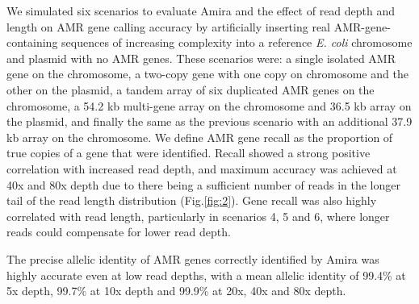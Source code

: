 We simulated six scenarios to evaluate Amira and the effect of read depth and length on AMR gene calling accuracy by artificially inserting real AMR-gene-containing sequences of increasing complexity into a reference \textit{E. coli} chromosome and plasmid with no AMR genes. These scenarios were: a single isolated AMR gene on the chromosome, a two-copy gene with one copy on chromosome and the other on the plasmid, a tandem array of six duplicated AMR genes on the chromosome, a 54.2 kb multi-gene array on the chromosome and 36.5 kb array on the plasmid, and finally the same as the previous scenario with an additional 37.9 kb array on the chromosome. We define AMR gene recall as the proportion of true copies of a gene that were identified. Recall showed a strong positive correlation with increased read depth, and maximum accuracy was achieved at 40x and 80x depth due to there being a sufficient number of reads in the longer tail of the read length distribution (Fig.\ref{fig:2}). Gene recall was also highly correlated with read length, particularly in scenarios 4, 5 and 6, where longer reads could compensate for lower read depth.

The precise allelic identity of AMR genes correctly identified by Amira was highly accurate even at low read depths, with a mean allelic identity of 99.4\% at 5x depth, 99.7\% at 10x depth and 99.9\% at 20x, 40x and 80x depth.

